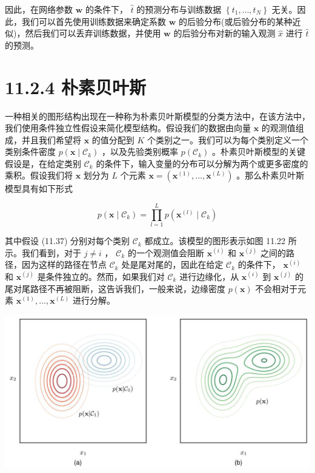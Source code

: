 \documentclass[10pt]{report}
\begin{document}
因此，在网络参数 \(\mathbf{w}\) 的条件下， \(\widehat{t}\) 的预测分布与训练数据 \(\left\{  {{t}_{1},\ldots ,{t}_{N}}\right\}\) 无关。因此，我们可以首先使用训练数据来确定系数 \(\mathbf{w}\) 的后验分布(或后验分布的某种近似)，然后我们可以丢弃训练数据，并使用 \(\mathbf{w}\) 的后验分布对新的输入观测 \(\widehat{x}\) 进行 \(\widehat{t}\) 的预测。

\section*{11.2.4 朴素贝叶斯}

一种相关的图形结构出现在一种称为朴素贝叶斯模型的分类方法中，在该方法中，我们使用条件独立性假设来简化模型结构。假设我们的数据由向量 \(\mathbf{x}\) 的观测值组成，并且我们希望将 \(\mathbf{x}\) 的值分配到 \(K\) 个类别之一。我们可以为每个类别定义一个类别条件密度 \(p\left( {\mathbf{x} \mid  {\mathcal{C}}_{k}}\right)\) ，以及先验类别概率 \(p\left( {\mathcal{C}}_{k}\right)\) 。朴素贝叶斯模型的关键假设是，在给定类别 \({\mathcal{C}}_{k}\) 的条件下，输入变量的分布可以分解为两个或更多密度的乘积。假设我们将 \(\mathbf{x}\) 划分为 \(L\) 个元素 \(\mathbf{x} = \left( {{\mathbf{x}}^{\left( 1\right) },\ldots ,{\mathbf{x}}^{\left( L\right) }}\right)\) 。那么朴素贝叶斯模型具有如下形式

\[
p\left( {\mathbf{x} \mid  {\mathcal{C}}_{k}}\right)  = \mathop{\prod }\limits_{{l = 1}}^{L}p\left( {{\mathbf{x}}^{\left( l\right) } \mid  {\mathcal{C}}_{k}}\right)  \tag{11.37}
\]

其中假设 (11.37) 分别对每个类别 \({\mathcal{C}}_{k}\) 都成立。该模型的图形表示如图 11.22 所示。我们看到，对于 \(j \neq  i\) ， \({\mathcal{C}}_{k}\) 的一个观测值会阻断 \({\mathbf{x}}^{\left( i\right) }\) 和 \({\mathbf{x}}^{\left( j\right) }\) 之间的路径，因为这样的路径在节点 \({\mathcal{C}}_{k}\) 处是尾对尾的，因此在给定 \({\mathcal{C}}_{k}\) 的条件下， \({\mathbf{x}}^{\left( i\right) }\) 和 \({\mathbf{x}}^{\left( j\right) }\) 是条件独立的。然而，如果我们对 \({\mathcal{C}}_{k}\) 进行边缘化，从 \({\mathbf{x}}^{\left( i\right) }\) 到 \({\mathbf{x}}^{\left( j\right) }\) 的尾对尾路径不再被阻断，这告诉我们，一般来说，边缘密度 \(p\left( \mathbf{x}\right)\) 不会相对于元素 \({\mathbf{x}}^{\left( 1\right) },\ldots ,{\mathbf{x}}^{\left( L\right) }\) 进行分解。

\begin{center}
\includegraphics[max width=1.0\textwidth]{images/0194e279-9b28-703a-88f4-c3ac21e2010d_364_236_342_1308_656_0.jpg}
\end{center}
\hspace*{3em} 
\end{document}
